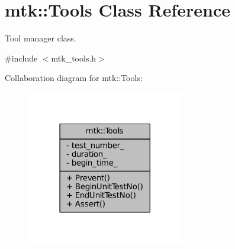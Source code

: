 \hypertarget{classmtk_1_1Tools}{\section{mtk\+:\+:Tools Class Reference}
\label{classmtk_1_1Tools}
}


Tool manager class.  




{\ttfamily \#include $<$mtk\+\_\+tools.\+h$>$}



Collaboration diagram for mtk\+:\+:Tools\+:\nopagebreak
\begin{figure}[H]
\begin{center}
\leavevmode
\includegraphics[width=194pt]{classmtk_1_1Tools__coll__graph}
\end{center}
\end{figure}
